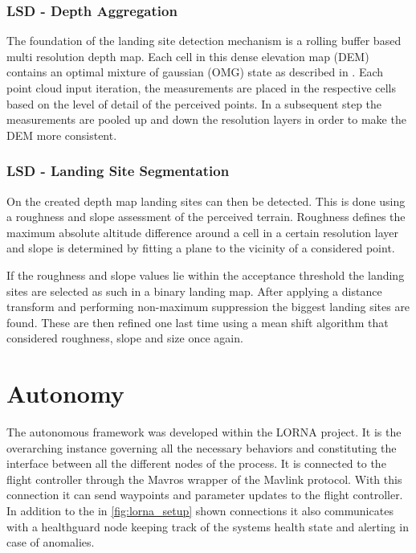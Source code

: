 \subsubsection{LSD - Depth Aggregation}

The foundation of the landing site detection mechanism is a rolling buffer based multi resolution depth map. Each cell in this dense elevation map (DEM) contains an optimal mixture of gaussian (OMG) state as described in \citet{LSD2}. Each point cloud input iteration, the measurements are placed in the respective cells based on the level of detail of the perceived points. In a subsequent step the measurements are pooled up and down the resolution layers in order to make the DEM more consistent.

\subsubsection{LSD - Landing Site Segmentation}

On the created depth map landing sites can then be detected. This is done using a roughness and slope assessment of the perceived terrain. Roughness defines the maximum absolute altitude difference around a cell in a certain resolution layer and slope is determined by fitting a plane to the vicinity of a considered point.

If the roughness and slope values lie within the acceptance threshold the landing sites are selected as such in a binary landing map. After applying a distance transform and performing non-maximum suppression the biggest landing sites are found. These are then refined one last time using a mean shift algorithm that considered roughness, slope and size once again.


\section{Autonomy}\label{sec:setup:autonomy}

The autonomous framework was developed within the LORNA project. It is the overarching instance governing all the necessary behaviors and constituting the interface between all the different nodes of the process. It is connected to the flight controller through the Mavros wrapper of the Mavlink protocol. With this connection it can send waypoints and parameter updates to the flight controller.
In addition to the in \cref{fig:lorna_setup} shown connections it also communicates with a healthguard node keeping track of the systems health state and alerting in case of anomalies.








